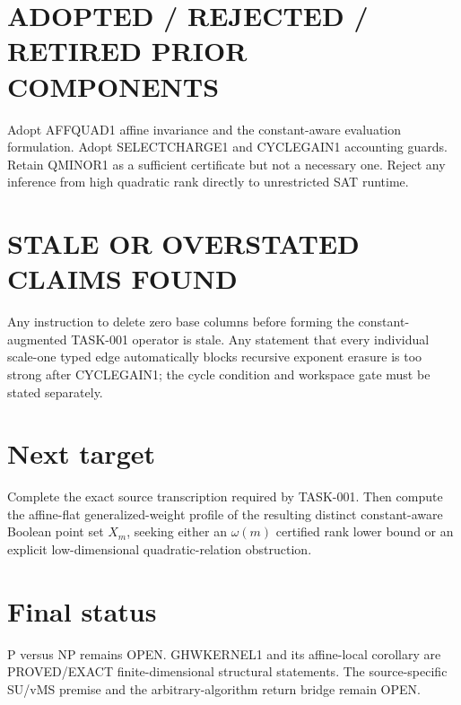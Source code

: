 \documentclass[11pt]{article}
\begin{document}
\section*{ADOPTED / REJECTED / RETIRED PRIOR COMPONENTS}
Adopt AFFQUAD1 affine invariance and the constant-aware evaluation formulation.  Adopt SELECTCHARGE1 and CYCLEGAIN1 accounting guards.  Retain QMINOR1 as a sufficient certificate but not a necessary one.  Reject any inference from high quadratic rank directly to unrestricted SAT runtime.

\section*{STALE OR OVERSTATED CLAIMS FOUND}
Any instruction to delete zero base columns before forming the constant-augmented TASK-001 operator is stale.  Any statement that every individual scale-one typed edge automatically blocks recursive exponent erasure is too strong after CYCLEGAIN1; the cycle condition and workspace gate must be stated separately.

\section*{Next target}
Complete the exact source transcription required by TASK-001.  Then compute the affine-flat generalized-weight profile of the resulting distinct constant-aware Boolean point set \(X_m\), seeking either an \(\omega(m)\) certified rank lower bound or an explicit low-dimensional quadratic-relation obstruction.

\section*{Final status}
P versus NP remains OPEN.  GHWKERNEL1 and its affine-local corollary are PROVED/EXACT finite-dimensional structural statements.  The source-specific SU/vMS premise and the arbitrary-algorithm return bridge remain OPEN.

\end{document}
